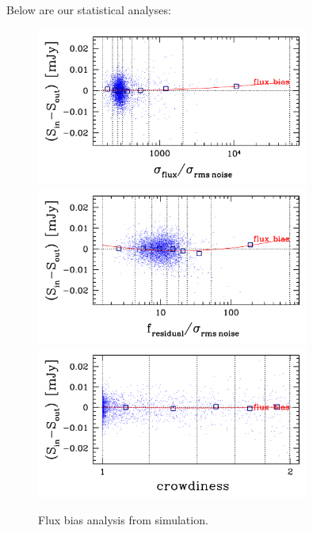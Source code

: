 \documentclass[11pt,a4paper]{article}
\begin{document}
Below are our statistical analyses:

\begin{figure}[H]
	\includegraphics[width=0.8\textwidth]{galsim_20cm_fbias_1}
	\includegraphics[width=0.8\textwidth]{galsim_20cm_fbias_2}
	\includegraphics[width=0.8\textwidth]{galsim_20cm_fbias_3}
	\caption{Flux bias analysis from simulation.}
\end{figure}
\end{document}
